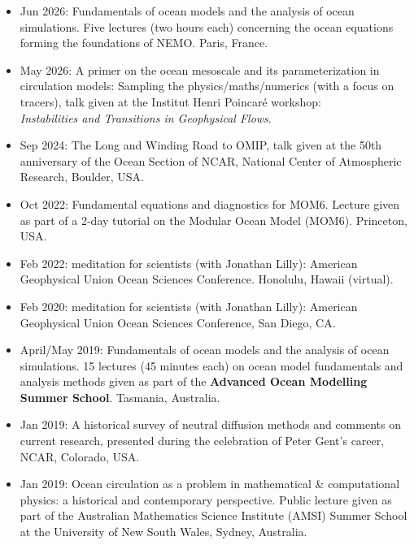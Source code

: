 \begin{itemize}[leftmargin=*]

\item Jun 2026: {\sc Fundamentals of ocean models and the analysis of ocean simulations}. Five lectures (two hours each) concerning the ocean equations forming the foundations of NEMO. Paris, France.  

\item May 2026: {\sc A primer on the ocean mesoscale and its parameterization in
  circulation models: Sampling the physics/maths/numerics (with a focus on tracers)}, talk given at the Institut Henri {Poincar\'{e}} workshop: \\ {\it Instabilities and Transitions in Geophysical Flows}.
  
\item Sep 2024: {\sc The Long and Winding Road to OMIP}, talk given at the 50th anniversary of the Ocean Section of NCAR, National Center of Atmospheric Research, Boulder, USA. 


\item Oct 2022: {\sc Fundamental equations and diagnostics for MOM6}. Lecture given as part of a 2-day tutorial on  the Modular Ocean Model (MOM6). Princeton, USA.  

\item Feb 2022: {\sc meditation for scientists} (with Jonathan Lilly): {\sc American Geophysical Union Ocean Sciences Conference}. Honolulu, Hawaii (virtual).

\item Feb 2020: {\sc meditation for scientists} (with Jonathan Lilly): {\sc American Geophysical Union Ocean Sciences Conference}, San Diego, CA. 

\item April/May 2019: {\sc Fundamentals of ocean models and the analysis of ocean simulations}. 15 lectures (45 minutes each) on ocean model fundamentals and analysis methods given as part of the {\bf Advanced Ocean Modelling Summer School}. Tasmania, Australia. 

\item Jan 2019: {\sc A historical survey of neutral diffusion methods and comments on current research}, presented during the celebration of Peter Gent's career, NCAR, Colorado, USA.  


\item Jan 2019: {\sc Ocean circulation
as a problem in mathematical \& computational physics:  a historical and contemporary  perspective}. Public lecture given as part of the Australian Mathematics Science Institute (AMSI) Summer School at the University of New South Wales, Sydney, Australia. 


\end{itemize}
